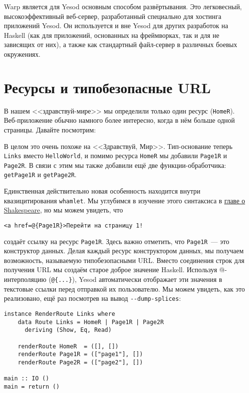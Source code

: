 Warp является для Yesod основным способом развёртывания. Это легковесный,
высокоэффективный веб-сервер, разработанный специально для хостинга приложений Yesod. Он
используется и вне Yesod для других разработок на Haskell (как для приложений, основанных
на фреймворках, так и для не зависящих от них), а также как стандартный файл-сервер в
различных боевых окружениях.

\section{Ресурсы и типобезопасные URL}

В нашем <<здравствуй-мире>> мы определили только один ресурс
(\lstinline!HomeR!). Веб-приложение обычно намного более интересно, когда в нём больше
одной страницы. Давайте посмотрим:


В целом это очень похоже на <<Здравствуй, Мир>>. Тип-основание теперь \lstinline!Links!
вместо \lstinline!HelloWorld!, и помимо ресурса \lstinline!HomeR! мы добавили
\lstinline!Page1R! и \lstinline!Page2R!. В связи с этим мы также добавили ещё две
функции-обработчика: \lstinline!getPage1R! и \lstinline!getPage2R!.

Единственная действительно новая особенность находится внутри квазицитирования
\lstinline'whamlet'. Мы углубимся в изучение этого синтаксиса в
\hyperref[chap:shakespeare]{главе о Shakespeare}, но мы можем увидеть, что
\begin{lstlisting}
<a href=@{Page1R}>Перейти на страницу 1!
\end{lstlisting}
создаёт ссылку на ресурс \lstinline!Page1R!. Здесь важно отметить, что \lstinline!Page1R!~---
это конструктор данных. Делая каждый ресурс конструктором данных, мы получаем
возможность, называемую типобезопасными URL. Вместо соединения строк для получения URL мы
создаём старое доброе значение Haskell. Используя @-интерполяцию (\lstinline!@{...}!),
Yesod автоматически отображает эти значения в текстовые ссылки перед отправкой их
пользователю. Мы можем увидеть, как это реализовано, ещё раз посмотрев на вывод
\lstinline!--dump-splices!:

\begin{lstlisting}
instance RenderRoute Links where
    data Route Links = HomeR | Page1R | Page2R
      deriving (Show, Eq, Read)

    renderRoute HomeR  = ([], [])
    renderRoute Page1R = (["page1"], [])
    renderRoute Page2R = (["page2"], [])

main :: IO ()
main = return ()
\end{lstlisting}

